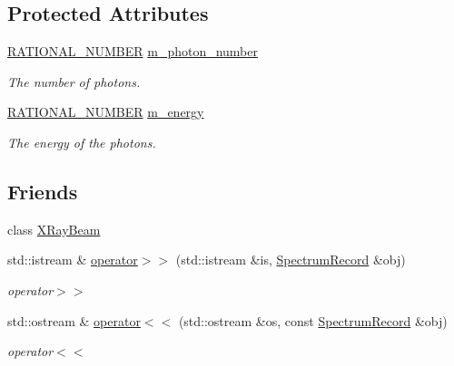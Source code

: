 \subsection*{Protected Attributes}
\begin{DoxyCompactItemize}
\item 
\hyperlink{namespace_utilities_a40969b96bd8d847b962e297cb79f08ce}{RATIONAL\_\-NUMBER} \hyperlink{classg_virtual_x_ray_1_1_spectrum_record_aedc7cfa913f395b4517160647784f9e4}{m\_\-photon\_\-number}
\begin{DoxyCompactList}\small\item\em The number of photons. \end{DoxyCompactList}\item 
\hyperlink{namespace_utilities_a40969b96bd8d847b962e297cb79f08ce}{RATIONAL\_\-NUMBER} \hyperlink{classg_virtual_x_ray_1_1_spectrum_record_a4591e49e25dce0c8a2c03969c2a7e685}{m\_\-energy}
\begin{DoxyCompactList}\small\item\em The energy of the photons. \end{DoxyCompactList}\end{DoxyCompactItemize}
\subsection*{Friends}
\begin{DoxyCompactItemize}
\item 
class \hyperlink{classg_virtual_x_ray_1_1_spectrum_record_a557b59f8b44e4ba7ffeb47f5b996f88e}{XRayBeam}
\item 
std::istream \& \hyperlink{classg_virtual_x_ray_1_1_spectrum_record_a2f9fcc5ea8b89bef18d2683a03ad50ef}{operator$>$$>$} (std::istream \&is, \hyperlink{classg_virtual_x_ray_1_1_spectrum_record}{SpectrumRecord} \&obj)
\begin{DoxyCompactList}\small\item\em operator$>$$>$ \end{DoxyCompactList}\item 
std::ostream \& \hyperlink{classg_virtual_x_ray_1_1_spectrum_record_a83ea879c8dc142f1a9220fa677d4f46c}{operator$<$$<$} (std::ostream \&os, const \hyperlink{classg_virtual_x_ray_1_1_spectrum_record}{SpectrumRecord} \&obj)
\begin{DoxyCompactList}\small\item\em operator$<$$<$ \end{DoxyCompactList}\end{DoxyCompactItemize}


